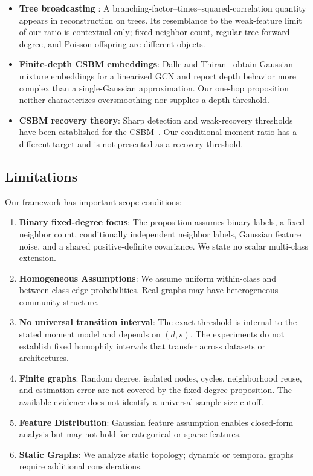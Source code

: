 \begin{itemize}
    \item \textbf{Tree broadcasting} \cite{kesten1966additional,mossel2015reconstruction}: A branching-factor--times--squared-correlation quantity appears in reconstruction on trees. Its resemblance to the weak-feature limit of our ratio is contextual only; fixed neighbor count, regular-tree forward degree, and Poisson offspring are different objects.

    \item \textbf{Finite-depth CSBM embeddings}: Dalle and Thiran~\cite{pmlr-v269-dalle25a} obtain Gaussian-mixture embeddings for a linearized GCN and report depth behavior more complex than a single-Gaussian approximation. Our one-hop proposition neither characterizes oversmoothing nor supplies a depth threshold.

    \item \textbf{CSBM recovery theory}: Sharp detection and weak-recovery thresholds have been established for the CSBM~\cite{lu2023contextual}. Our conditional moment ratio has a different target and is not presented as a recovery threshold.
\end{itemize}

\subsection{Limitations}

Our framework has important scope conditions:

\begin{enumerate}
    \item \textbf{Binary fixed-degree focus}: The proposition assumes binary labels, a fixed neighbor count, conditionally independent neighbor labels, Gaussian feature noise, and a shared positive-definite covariance. We state no scalar multi-class extension.

    \item \textbf{Homogeneous Assumptions}: We assume uniform within-class and between-class edge probabilities. Real graphs may have heterogeneous community structure.

    \item \textbf{No universal transition interval}: The exact threshold is internal to the stated moment model and depends on $(d,s)$. The experiments do not establish fixed homophily intervals that transfer across datasets or architectures.

    \item \textbf{Finite graphs}: Random degree, isolated nodes, cycles, neighborhood reuse, and estimation error are not covered by the fixed-degree proposition. The available evidence does not identify a universal sample-size cutoff.

    \item \textbf{Feature Distribution}: Gaussian feature assumption enables closed-form analysis but may not hold for categorical or sparse features.

    \item \textbf{Static Graphs}: We analyze static topology; dynamic or temporal graphs require additional considerations.
\end{enumerate}

